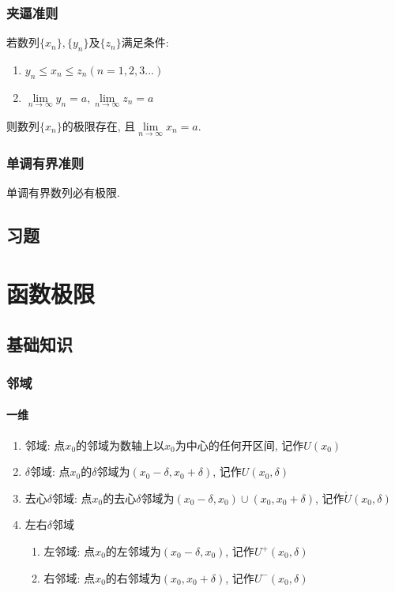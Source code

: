 \subsection{夹逼准则}
若数列$ \{x_{n}\}, \{y_{n}\} $及$ \{z_{n}\} $满足条件:
\begin{enumerate}
\item $ y_{n}\le x_{n}\le z_{n}(n=1,2,3...) $
\item $ \lim\limits_{n\rightarrow \infty}y_{n}=a, \lim\limits_{n\rightarrow \infty}z_{n}=a $
\end{enumerate}\par
则数列$ \{x_{n}\} $的极限存在, 且$ \lim\limits_{n\rightarrow \infty}x_{n}=a $.
\subsection{单调有界准则}
单调有界数列必有极限.
\section{习题}
\chapter{函数极限}
\section{基础知识}
\subsection{邻域}
\subsubsection{一维}
\begin{enumerate}
\item 邻域: 点$ x_{0} $的邻域为数轴上以$ x_{0} $为中心的任何开区间, 记作$ U(x_{0}) $
\item $ \delta $邻域: 点$ x_{0} $的$ \delta $邻域为$ (x_{0}-\delta,x_{0}+\delta) $, 记作$ U(x_{0},\delta) $
\item 去心$ \delta $邻域: 点$ x_{0} $的去心$ \delta $邻域为$ (x_{0}-\delta,x_{0})\cup (x_{0},x_{0}+\delta) $, 记作$ \mathring{U}(x_{0},\delta) $
\item 左右$ \delta $邻域
\begin{enumerate}
\item 左邻域: 点$ x_{0} $的左邻域为$ (x_{0}-\delta,x_{0}) $, 记作$ U^{+}(x_{0},\delta) $
\item 右邻域: 点$ x_{0} $的右邻域为$ (x_{0},x_{0}+\delta) $, 记作$ U^{-}(x_{0},\delta) $
\end{enumerate}
\end{enumerate}
